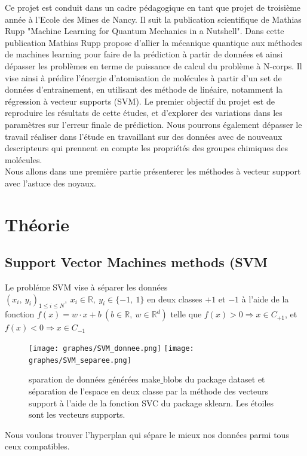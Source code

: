 \documentclass[a4paper,12pt,titlepage]{report}
\begin{document}
Ce projet est conduit dans un cadre pédagogique en tant que projet de troisième année à l'Ecole des Mines de Nancy. Il suit la publication scientifique de Mathias Rupp "Machine Learning for Quantum Mechanics in a Nutshell". Dans cette publication Mathias Rupp propose d'allier la mécanique quantique aux méthodes de machines learning pour faire de la prédiction à partir de données et ainsi dépasser les problèmes en terme de puissance de calcul du problème à N-corps. Il vise ainsi à prédire l'énergie d'atomisation de molécules à partir d'un set de données d'entrainement, en utilisant des méthode de  linéaire, notamment la régression à vecteur supports (SVM). 
Le premier objectif du projet est de reproduire les résultats de cette études, et d'explorer des variations dans les paramètres sur l'erreur finale de prédiction. Nous pourrons également dépasser le travail réaliser dans l'étude en travaillant sur des données avec de nouveaux descripteurs qui prennent en compte les propriétés des groupes chimiques des molécules.\\
Nous allons dans une première partie présenterer les méthodes à vecteur support avec l'astuce des noyaux.

\chapter{Théorie}
\label{C1}
\section{Support Vector Machines methods (SVM}
Le probléme SVM vise à séparer les données $(x_{i},\ y_{i})_{1 \leqslant i \leqslant N},\ x_{i} \in \mathbb{R}, \ y_{i} \in \{-1,\ 1\}$ en deux classes $+1$ et $-1$ à l'aide de la fonction $f(x) = w \cdot x + b \ (b \in \mathbb{R},\ w \in  \mathbb{R}^{d})$ telle que $f(x) > 0 \Rightarrow x \in C_{+1}$, et $f(x) < 0 \Rightarrow x \in C_{-1}$

\begin{figure}[!h]
	\begin{center}
	\centering	
		\texttt{[image: graphes/SVM\_donnee.png]}
		\texttt{[image: graphes/SVM\_separee.png]}
		\caption{sparation de données générées make$\_$blobs du package dataset et séparation de l'espace en deux classe par la méthode des vecteurs support à l'aide de la fonction SVC du package sklearn. Les étoiles sont les vecteurs supports.}
	\end{center}
\end{figure}
Nous voulons trouver l'hyperplan qui sépare le mieux nos données parmi tous ceux compatibles.
\end{document}
